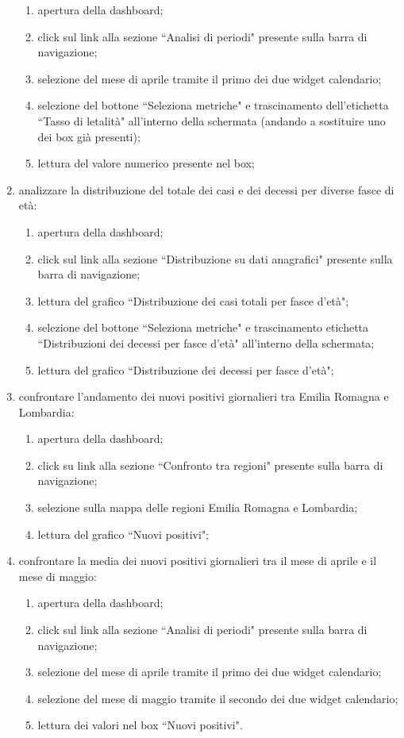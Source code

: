 \begin{enumerate}
    \begin{enumerate}
        \item apertura della dashboard;
        \item click sul link alla sezione ``Analisi di periodi" presente sulla barra di navigazione;
        \item selezione del mese di aprile tramite il primo dei due widget calendario;
        \item selezione del bottone ``Seleziona metriche" e trascinamento dell'etichetta ``Tasso di letalità" all'interno della schermata (andando a sostituire uno dei box già presenti);
        \item lettura del valore numerico presente nel box;
    \end{enumerate}
    \item analizzare la distribuzione del totale dei casi e dei decessi per diverse fasce di età:
    \begin{enumerate}
        \item apertura della dashboard;
        \item click sul link alla sezione ``Distribuzione su dati anagrafici" presente sulla barra di navigazione;
        \item lettura del grafico ``Distribuzione dei casi totali per fasce d’età";
        \item selezione del bottone ``Seleziona metriche" e trascinamento etichetta ``Distribuzioni dei decessi per fasce d'età" all'interno della schermata;
        \item lettura del grafico ``Distribuzione dei decessi per fasce d'età";
    \end{enumerate}
    \item confrontare l'andamento dei nuovi positivi giornalieri tra Emilia Romagna e Lombardia:
    \begin{enumerate}
        \item apertura della dashboard;
        \item click su link alla sezione ``Confronto tra regioni" presente sulla barra di navigazione;
        \item selezione sulla mappa delle regioni Emilia Romagna e Lombardia;
        \item lettura del grafico ``Nuovi positivi";
    \end{enumerate}
    \item confrontare la media dei nuovi positivi giornalieri tra il mese di aprile e il mese di maggio:
    \begin{enumerate}
        \item apertura della dashboard;
        \item click sul link alla sezione ``Analisi di periodi" presente sulla barra di navigazione;
        \item selezione del mese di aprile tramite il primo dei due widget calendario;
        \item selezione del mese di maggio tramite il secondo dei due widget calendario;
        \item lettura dei valori nel box ``Nuovi positivi".
    \end{enumerate}
\end{enumerate}
